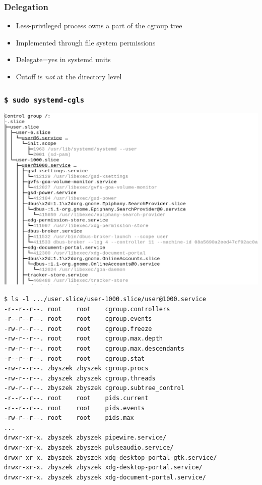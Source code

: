 \documentclass[serif]{beamer}
\begin{document}

\begin{frame}
  \frametitle{Delegation}

  \begin{itemize}
  \item Less-privileged process owns a part of the cgroup tree
  \item Implemented through file system permissions
  \item Delegate=yes in systemd units
  \item Cutoff is \emph{not} at the directory level
  \end{itemize}
\end{frame}

\begin{frame}[fragile]
  \tiny
  \frametitle{\texttt{\$ sudo systemd-cgls}}
  \includegraphics[width=\textwidth]{images/delegation-cgls.png}
\end{frame}

\begin{frame}[fragile]
  \begin{verbatim}
$ ls -l .../user.slice/user-1000.slice/user@1000.service
-r--r--r--. root    root    cgroup.controllers
-r--r--r--. root    root    cgroup.events
-rw-r--r--. root    root    cgroup.freeze
-rw-r--r--. root    root    cgroup.max.depth
-rw-r--r--. root    root    cgroup.max.descendants
-r--r--r--. root    root    cgroup.stat
-rw-r--r--. zbyszek zbyszek cgroup.procs
-rw-r--r--. zbyszek zbyszek cgroup.threads
-rw-r--r--. zbyszek zbyszek cgroup.subtree_control
-r--r--r--. root    root    pids.current
-r--r--r--. root    root    pids.events
-rw-r--r--. root    root    pids.max
...
drwxr-xr-x. zbyszek zbyszek pipewire.service/
drwxr-xr-x. zbyszek zbyszek pulseaudio.service/
drwxr-xr-x. zbyszek zbyszek xdg-desktop-portal-gtk.service/
drwxr-xr-x. zbyszek zbyszek xdg-desktop-portal.service/
drwxr-xr-x. zbyszek zbyszek xdg-document-portal.service/
  \end{verbatim}
\end{frame}
\end{document}

